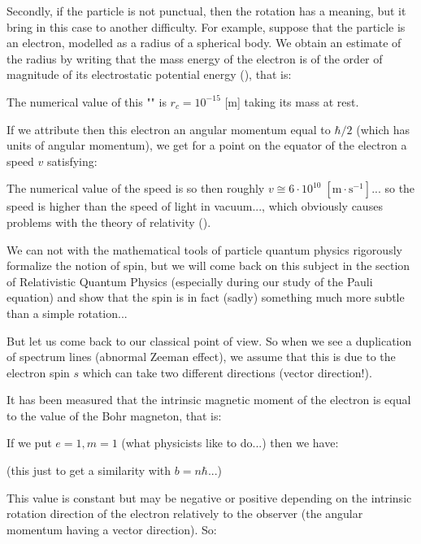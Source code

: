    Secondly, if the particle is not punctual, then the rotation has a meaning, but it bring in this case to another difficulty. For example, suppose that the particle is an electron, modelled as a radius of a spherical body. We obtain an estimate of the radius by writing that the mass energy of the electron is of the order of magnitude of its electrostatic potential energy (), that is:
   
   The numerical value of this "" is $r_c=10^{-15}$ [m] taking its mass at rest.

    If we attribute then this electron an angular momentum equal to $\hbar/2$ (which has units of angular momentum), we get for a point on the equator of the electron a speed $v$ satisfying:
    
    The numerical value of the speed is so then roughly $v\cong 6\cdot 10^{10}\;[\text{m}\cdot \text{s}^{-1}]$... so the speed is higher than the speed of light in vacuum..., which obviously causes problems with the theory of relativity ().

   We can not with the mathematical tools of particle quantum physics rigorously formalize the notion of spin, but we will come back on this subject in the section of  Relativistic Quantum Physics (especially during our study of the Pauli equation) and show that the spin is in fact (sadly) something much more subtle than a simple rotation...

    But let us come back to our classical point of view. So when we see a duplication of spectrum lines (abnormal Zeeman effect), we assume that this is due to the electron spin $s$ which can take two different directions (vector direction!).

    It has been measured that the intrinsic magnetic moment of the electron is equal to the value of the Bohr magneton, that is:
    
    If we put $e=1,m=1$ (what physicists like to do...) then we have:
         
    (this just to get a similarity with $b=n\hbar$...)

     This value is constant but may be negative or positive depending on the intrinsic rotation direction of the electron relatively to the observer (the angular momentum having a vector direction). So:
    
